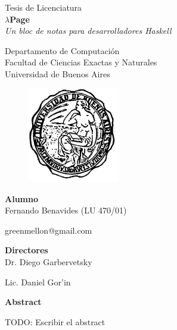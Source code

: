 \documentclass[a4paper]{article}
\begin{document}
    \thispagestyle{empty}
    \begin{center}
	    {\Large Tesis de Licenciatura}\\[1em]
	    {\huge \textbf{$\lambda$Page}}\\[0.5em]
	    {\large \textit{Un bloc de notas para desarrolladores Haskell}}\\[1em]
	    \par{}
	    {\large Departamento de Computaci\'on}\\[0.5em]
	    {\large Facultad de Ciencias Exactas y Naturales}\\[0.5em]
	    {\large Universidad de Buenos Aires}
	    \par{}
	    \begin{figure}[h]
	        \begin{center}
	        \includegraphics[width=40mm]{logoUba}
	        \end{center}
	    \end{figure}
	    {\Large \textbf{Alumno}}\\[0.8em]
	    {\Large Fernando Benavides (LU 470/01)} \par
	    {\Large greenmellon@gmail.com} \par
	    \par{}
	    {\Large \textbf{Directores}}\\[0.8em]
	    {\Large Dr. Diego Garbervetsky} \par
	    {\Large Lic. Daniel Gor'in} \par
	    \par{}
         {\Large \textbf{Abstract}}\\[0.5em]
    \end{center}
    TODO: Escribir el abstract
    \newpage

\tableofcontents
\newpage
\end{document}
